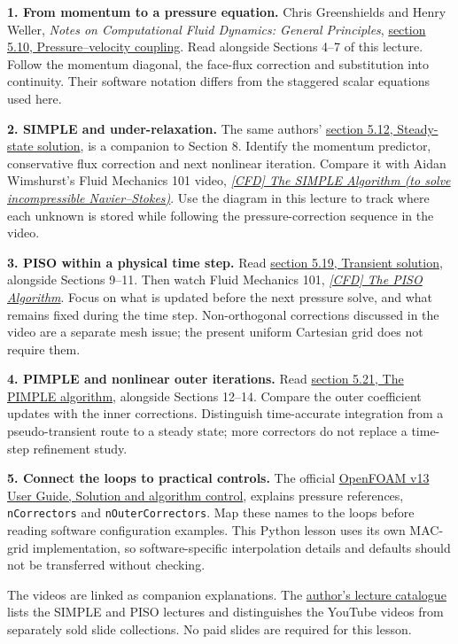 \newpage
{}
\textbf{1. From momentum to a pressure equation.}
Chris Greenshields and Henry Weller, \emph{Notes on Computational Fluid Dynamics: General Principles},
\href{https://doc.cfd.direct/notes/cfd-general-principles/pressure-velocity-coupling}{section 5.10, Pressure--velocity coupling}.
Read alongside Sections 4--7 of this lecture. Follow the momentum diagonal,
the face-flux correction and substitution into continuity. Their software
notation differs from the staggered scalar equations used here.

\textbf{2. SIMPLE and under-relaxation.}
The same authors' \href{https://doc.cfd.direct/notes/cfd-general-principles/steady-state-solution}{section 5.12, Steady-state solution},
is a companion to Section 8. Identify the momentum predictor, conservative
flux correction and next nonlinear iteration. Compare it with Aidan Wimshurst's
Fluid Mechanics 101 video,
\href{https://www.youtube.com/watch?v=OOILoJ1zuiw}{\emph{[CFD] The SIMPLE Algorithm (to solve incompressible Navier--Stokes)}}.
Use the diagram in this lecture to track where each unknown is stored while
following the pressure-correction sequence in the video.

\textbf{3. PISO within a physical time step.}
Read \href{https://doc.cfd.direct/notes/cfd-general-principles/transient-solution}{section 5.19, Transient solution},
alongside Sections 9--11. Then watch Fluid Mechanics 101,
\href{https://www.youtube.com/watch?v=ahdW5TKacok}{\emph{[CFD] The PISO Algorithm}}.
Focus on what is updated before the next pressure solve, and what remains
fixed during the time step. Non-orthogonal corrections discussed in the video
are a separate mesh issue; the present uniform Cartesian grid does not require them.

\textbf{4. PIMPLE and nonlinear outer iterations.}
Read \href{https://doc.cfd.direct/notes/cfd-general-principles/the-pimple-algorithm}{section 5.21, The PIMPLE algorithm},
alongside Sections 12--14. Compare the outer coefficient updates with the
inner corrections. Distinguish time-accurate integration from a
pseudo-transient route to a steady state; more correctors do not replace a
time-step refinement study.

\textbf{5. Connect the loops to practical controls.}
The official \href{https://doc.cfd.direct/openfoam/user-guide-v13/fvsolution}{OpenFOAM v13 User Guide, Solution and algorithm control},
explains pressure references, \texttt{nCorrectors} and
\texttt{nOuterCorrectors}. Map these names to the loops before reading
software configuration examples. This Python lesson uses its own MAC-grid
implementation, so software-specific interpolation details and defaults
should not be transferred without checking.

The videos are linked as companion explanations. The
\href{https://www.fluidmechanics101.com/pages/lectures.html}{author's lecture catalogue}
lists the SIMPLE and PISO lectures and distinguishes the YouTube videos
from separately sold slide collections. No paid slides are required for this lesson.
